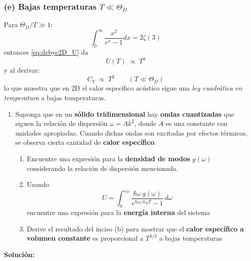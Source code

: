 \documentclass{article}
\newenvironment{AGbox}[1][7]%
{%
  \begin{tcolorbox}[
    enhanced, breakable,
    colframe=AppleGreen,
    colback=AppleGreen!#1,
    boxrule=1pt,
    borderline west={2mm}{-10mm}{AppleGreen},
    sharp corners=southwest,
    left=14pt,right=14pt,top=10pt,bottom=10pt,
     boxsep=6pt,
  ]%
}{%
  \end{tcolorbox}%
}
\begin{document}
\subsubsection*{\textbf{(e) Bajas temperaturas $T\ll \Theta_D$}}
Para $\Theta_D/T \gg 1$:
\[
\int_{0}^{\infty}\frac{x^2}{e^{x}-1}dx = 2\zeta(3)
\]
entonces \eqref{eq:debye2D_U} da
\[
U(T)\;\propto\;T^3
\]
y al derivar:
\begin{equation}
\boxed{\,C_V \;\propto\; T^2 \qquad (T\ll \Theta_D)\,}
\label{eq:debye2D_Cv_bajaT}
\end{equation}
lo que muestra que en 2D el calor específico acústico sigue una \emph{ley cuadrática en temperatura} a bajas temperaturas.


\begin{AGbox}[8]
\begin{enumerate}[label={{\textcolor{trueblue}{\textbf{Pr.} \arabic*.6}}}, start=1]
  \item Suponga que en un \textbf{sólido tridimensional} hay \textbf{ondas cuantizadas} que siguen la relación de dispersión $\omega = A k^{2}$, donde $A$ es una constante con unidades apropiadas.  
  Cuando dichas ondas son excitadas por efectos térmicos, se observa cierta cantidad de \textbf{calor específico}.  
  \begin{enumerate}[label=\textbf{(\alph*)}]
    \item Encuentre una expresión para la \textbf{densidad de modos} $g(\omega)$ considerando la relación de dispersión mencionada.  
    \item Usando
    \begin{equation}
      U = \int_{0}^{\omega_D} 
      \frac{ \hbar \omega\, g(\omega) }
      { e^{\hbar \omega / k_B T} - 1 }
      \, d\omega
      \label{eq:energia_dispersión_cuadrática}
    \end{equation}
    encuentre una expresión para la \textbf{energía interna} del sistema
    \item Derive el resultado del inciso (b) para mostrar que el \textbf{calor específico a volumen constante} es proporcional a $T^{3/2}$ a bajas temperaturas
  \end{enumerate}
\end{enumerate}
\end{AGbox}

\textcolor{Cinnabar}{\textbf{Solución:}}
\end{document}
